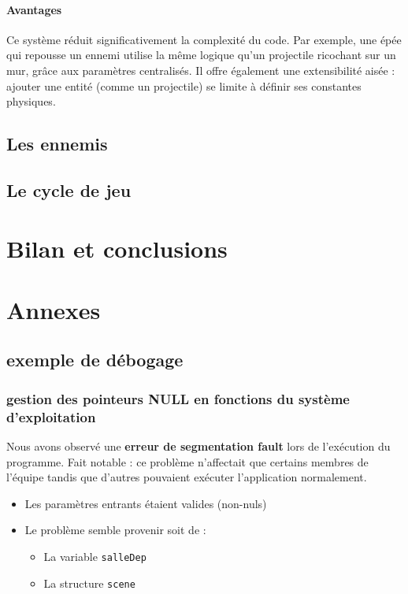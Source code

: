 \documentclass[a4paper,11pt]{article}
\begin{document}
\paragraph{Avantages}  
Ce système réduit significativement la complexité du code. Par exemple, une épée qui repousse un ennemi utilise la même logique qu’un projectile ricochant sur un mur, grâce aux paramètres centralisés. Il offre également une extensibilité aisée : ajouter une entité (comme un projectile) se limite à définir ses constantes physiques.

\subsection{Les ennemis}

\subsection{Le cycle de jeu}

\section{Bilan et conclusions}

\section{Annexes}

\subsection{exemple de débogage}
\subsubsection{gestion des pointeurs NULL en fonctions du système d'exploitation}
Nous avons observé une \textbf{erreur de segmentation fault} lors de l'exécution du programme. Fait notable : ce problème n'affectait que certains membres de l'équipe tandis que d'autres pouvaient exécuter l'application normalement.

\begin{itemize}
    \item Les paramètres entrants étaient valides (non-nuls)
    \item Le problème semble provenir soit de :
    \begin{itemize}
        \item La variable \texttt{salleDep}
        \item La structure \texttt{scene}
    \end{itemize}
\end{itemize}
\end{document}
